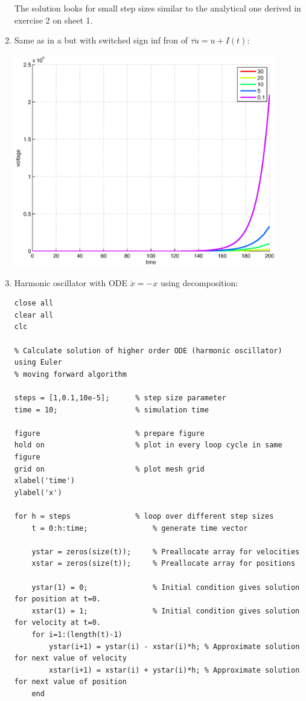 \documentclass[12pt]{article}
\newenvironment{exercise}[2][Exercise]{\begin{trivlist}
\item[\hskip \labelsep {\bfseries #1}\hskip \labelsep {\bfseries #2.}]}{\end{trivlist}}
\begin{document}
\begin{exercise}{2.3}
\begin{enumerate}
The solution looks for small step sizes similar to the analytical one derived in exercise 2 on sheet 1.

\item Same as in a but with switched sign inf fron of $\tau \dot{u} = u + I(t)$:

\includegraphics[width=4.5in]{exercise1b.eps}

\item Harmonic oscillator with ODE $\ddot{x} = -x$ using decomposition:
\begin{tiny}
\begin{lstlisting}
close all
clear all
clc

% Calculate solution of higher order ODE (harmonic oscillator) using Euler
% moving forward algorithm

steps = [1,0.1,10e-5];      % step size parameter
time = 10;                  % simulation time

figure                      % prepare figure
hold on                     % plot in every loop cycle in same figure
grid on                     % plot mesh grid
xlabel('time')
ylabel('x')

for h = steps               % loop over different step sizes
    t = 0:h:time;               % generate time vector
    
    ystar = zeros(size(t));     % Preallocate array for velocities
    xstar = zeros(size(t));     % Preallocate array for positions

    ystar(1) = 0;               % Initial condition gives solution for position at t=0.
    xstar(1) = 1;               % Initial condition gives solution for velocity at t=0.
    for i=1:(length(t)-1)
        ystar(i+1) = ystar(i) - xstar(i)*h; % Approximate solution for next value of velocity
        xstar(i+1) = xstar(i) + ystar(i)*h; % Approximate solution for next value of position
    end
    

\end{lstlisting}
\end{tiny}
\end{enumerate}
\end{exercise}
\end{document}
